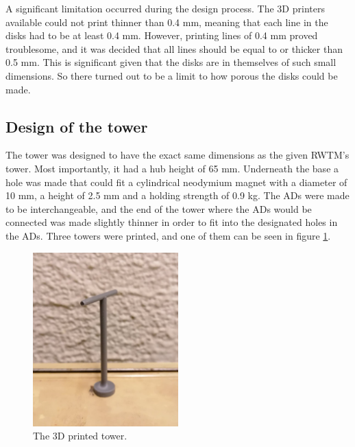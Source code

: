 A significant limitation occurred during the design process. The 3D printers available could not print thinner than 0.4 \si{\mm}, meaning that each line in the disks had to be at least 0.4 \si{\mm}. However, printing lines of 0.4 \si{\mm} proved troublesome, and it was decided that all lines should be equal to or thicker than 0.5 \si{\mm}. This is significant given that the disks are in themselves of such small dimensions. So there turned out to be a limit to how porous the disks could be made. 


\subsection{Design of the tower}
The tower was designed to have the exact same dimensions as the given \gls{RWTM}'s tower. Most importantly, it had a hub height of 65 \si{\mm}. Underneath the base a hole was made that could fit a cylindrical neodymium magnet with a diameter of 10 \si{\mm}, a height of 2.5 \si{\mm} and a holding strength of 0.9 \si{\kg}. The \gls{AD}s were made to be interchangeable, and the end of the tower where the \gls{AD}s would be connected was made slightly thinner in order to fit into the designated holes in the \gls{AD}s. Three towers were printed, and one of them can be seen in figure \ref{fig:towers}.

\begin{figure}
    \centering
    \includegraphics[width=0.5\textwidth]{0_Images/tower.jpg}    
    \caption[The 3D printed tower.]{The 3D printed tower.}
    \label{fig:towers}
\end{figure}


